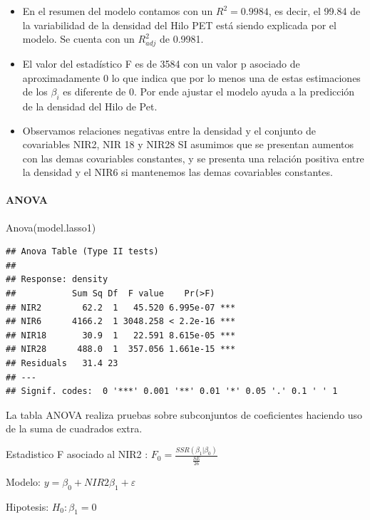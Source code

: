 \documentclass[
]{article}
\newenvironment{Shaded}{\begin{snugshade}}{\end{snugshade}}
\newcommand{\FunctionTok}[1]{\textcolor[rgb]{0.00,0.00,0.00}{#1}}
\newcommand{\NormalTok}[1]{#1}
\begin{document}
\begin{itemize}
\item
  En el resumen del modelo contamos con un \(R^2=0.9984\), es decir, el
  99.84 de la variabilidad de la densidad del Hilo PET está siendo
  explicada por el modelo. Se cuenta con un \(R^2_{adj}\) de 0.9981.
\item
  El valor del estadístico F es de 3584 con un valor p asociado de
  aproximadamente 0 lo que indica que por lo menos una de estas
  estimaciones de los \(\beta_i\) es diferente de 0. Por ende ajustar el
  modelo ayuda a la predicción de la densidad del Hilo de Pet.
\item
  Observamos relaciones negativas entre la densidad y el conjunto de
  covariables NIR2, NIR 18 y NIR28 SI asumimos que se presentan aumentos
  con las demas covariables constantes, y se presenta una relación
  positiva entre la densidad y el NIR6 si mantenemos las demas
  covariables constantes.
\end{itemize}

\hypertarget{anova}{%
\paragraph{ANOVA}\label{anova}}

\begin{Shaded}
\begin{Highlighting}[]
\FunctionTok{Anova}\NormalTok{(model.lasso1)}
\end{Highlighting}
\end{Shaded}

\begin{verbatim}
## Anova Table (Type II tests)
## 
## Response: density
##           Sum Sq Df  F value    Pr(>F)    
## NIR2        62.2  1   45.520 6.995e-07 ***
## NIR6      4166.2  1 3048.258 < 2.2e-16 ***
## NIR18       30.9  1   22.591 8.615e-05 ***
## NIR28      488.0  1  357.056 1.661e-15 ***
## Residuals   31.4 23                       
## ---
## Signif. codes:  0 '***' 0.001 '**' 0.01 '*' 0.05 '.' 0.1 ' ' 1
\end{verbatim}

La tabla ANOVA realiza pruebas sobre subconjuntos de coeficientes
haciendo uso de la suma de cuadrados extra.

Estadistico F asociado al NIR2 :
\(F_0 = \frac{{SSR(\beta_1|\beta_0)}}{\frac{SE}{26}}\)

Modelo: \(y =\beta_0+NIR2\beta_1+\varepsilon\)

Hipotesis: \(H_0: \beta_1=0\)
\end{document}

